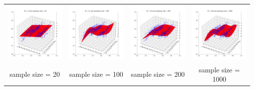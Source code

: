 \documentclass[11pt]{article}
\begin{document}
\begin{center}
  \setlength\tabcolsep{0pt}
  \begin{tabular}{cccc}
  \includegraphics[width=5cm]{regression/2d-ls-20-test-fig.png}
  & \includegraphics[width=5cm]{regression/2d-ls-100-test-fig.png}&
  \includegraphics[width=5cm]{regression/2d-ls-200-test-fig.png}
  & \includegraphics[width=5cm]{regression/2d-ls-1000-test-fig.png}\\
  sample size = 20 & sample size = 100&
  sample size = 200 & sample size = 1000 \\
  \end{tabular}
  \end{center}
\end{document}
